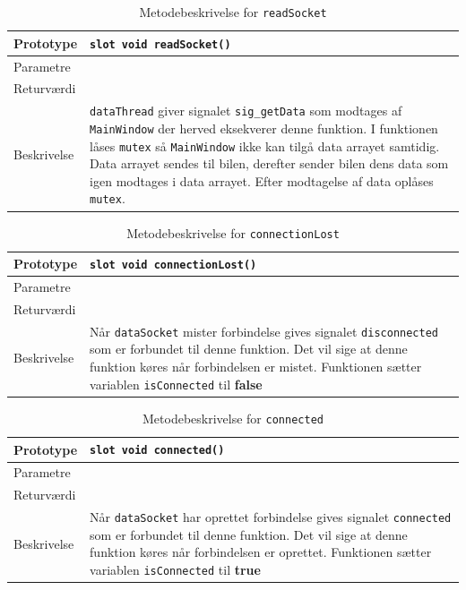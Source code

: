 \begin{table}[H]
\begin{tabularx}{\textwidth}{| l | Z |} \hline
Prototype & \texttt{slot void readSocket()} \\\hline
Parametre &   \\\hline
Returværdi &  \\\hline
Beskrivelse & \texttt{dataThread} giver signalet \texttt{sig\_getData} som modtages af \texttt{MainWindow} der herved eksekverer denne funktion. I funktionen låses \texttt{mutex} så \texttt{MainWindow} ikke kan tilgå data arrayet samtidig. Data arrayet sendes til bilen, derefter sender bilen dens data som igen modtages i data arrayet. Efter modtagelse af data oplåses \texttt{mutex}. \\\hline
\end{tabularx}
\caption{Metodebeskrivelse for \texttt{readSocket}}
\label{table:met_readSocket}
\end{table}

\begin{table}[H]
\begin{tabularx}{\textwidth}{| l | Z |} \hline
Prototype & \texttt{slot void connectionLost()} \\\hline
Parametre &   \\\hline
Returværdi &  \\\hline
Beskrivelse & Når \texttt{dataSocket} mister forbindelse gives signalet \texttt{disconnected} som er forbundet til denne funktion. Det vil sige at denne funktion køres når forbindelsen er mistet. Funktionen sætter variablen \texttt{isConnected} til \textbf{false}  \\\hline
\end{tabularx}
\caption{Metodebeskrivelse for \texttt{connectionLost}}
\label{table:met_connectionLost}
\end{table}

\begin{table}[H]
\begin{tabularx}{\textwidth}{| l | Z |} \hline
Prototype & \texttt{slot void connected()} \\\hline
Parametre &   \\\hline
Returværdi &  \\\hline
Beskrivelse & Når \texttt{dataSocket} har oprettet forbindelse gives signalet \texttt{connected} som er forbundet til denne funktion. Det vil sige at denne funktion køres når forbindelsen er oprettet. Funktionen sætter variablen \texttt{isConnected} til \textbf{true}  \\\hline
\end{tabularx}
\caption{Metodebeskrivelse for \texttt{connected}}
\label{table:met_connected}
\end{table}


